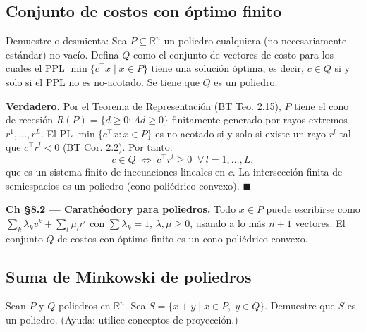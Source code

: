 \documentclass[12pt]{article}
\theoremstyle{plain}
\begin{document}
\bigskip

\subsection{Conjunto de costos con óptimo finito}

Demuestre o desmienta: Sea $P \subseteq \mathbb{R}^n$ un poliedro cualquiera (no
necesariamente estándar) no vacío. Defina $Q$ como el conjunto de vectores de costo para
los cuales el PPL $\min\{c^\top x \mid x \in P\}$ tiene una solución óptima, es decir,
$c \in Q$ si y solo si el PPL no es no-acotado. Se tiene que $Q$ es un poliedro.

\begin{solucion}

\textbf{Verdadero.} Por el Teorema de Representación (BT Teo. 2.15), $P$ tiene el cono de recesión $R(P) = \{d \geq 0 : Ad \geq 0\}$ finitamente generado por rayos extremos $r^1,\ldots,r^L$. El PL $\min\{c^\top x : x \in P\}$ es no-acotado si y solo si existe un rayo $r^l$ tal que $c^\top r^l < 0$ (BT Cor. 2.2). Por tanto:
\[
c \in Q \;\Longleftrightarrow\; c^\top r^l \geq 0 \;\;\forall\, l = 1,\ldots,L,
\]
que es un sistema finito de inecuaciones lineales en $c$. La intersección finita de semiespacios es un poliedro (cono poliédrico convexo). $\blacksquare$

\end{solucion}

\begin{teofund}
\textbf{Ch §8.2 — Carathéodory para poliedros.} Todo $x\in P$ puede escribirse como $\sum_k\lambda_k v^k+\sum_l\mu_l r^l$ con $\sum\lambda_k=1$, $\lambda,\mu\geq 0$, usando a lo más $n+1$ vectores. El conjunto $Q$ de costos con óptimo finito es un cono poliédrico convexo.
\end{teofund}

\bigskip

\subsection{Suma de Minkowski de poliedros}

Sean $P$ y $Q$ poliedros en $\mathbb{R}^n$. Sea $S = \{x + y \mid x \in P,\; y \in Q\}$.
Demuestre que $S$ es un poliedro. (Ayuda: utilice conceptos de proyección.)
\end{document}
